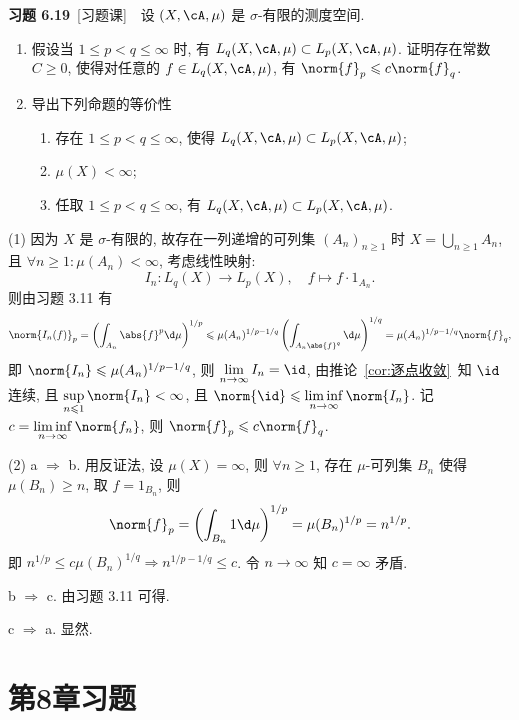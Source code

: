 	\textbf{习题 6.19}\ [习题课]\ \ 设 $ (X, \cA, \mu) $ 是 $ \sigma $-有限的测度空间.
	\begin{enumerate}
		\item 假设当 $ 1\leqslant p<q\leqslant\infty $ 时, 有 $ L_{q}(X, \cA, \mu)\subset L_{p}(X, \cA, \mu) $. 证明存在常数 $ C\geqslant0 $, 使得对任意的 $ f\in L_{q}(X, \cA, \mu) $, 有 $ \norm{f}_{p}\leqslant c\norm{f}_{q} $.
		\item 导出下列命题的等价性
		\begin{enumerate}
			\item 存在 $ 1\leqslant p<q\leqslant\infty $, 使得 $ L_{q}(X, \cA, \mu)\subset L_{p}(X, \cA, \mu) $;
			\item $ \mu(X)<\infty $;
			\item 任取 $ 1\leqslant p<q\leqslant\infty $, 有 $ L_{q}(X, \cA, \mu)\subset L_{p}(X, \cA, \mu) $.
		\end{enumerate}
	\end{enumerate}
	\begin{answer}
		(1) 因为 $ X $ 是 $ \sigma $-有限的, 故存在一列递增的可列集 $ (A_{n})_{n\geqslant1} $ 时 $ X=\bigcup_{n\geqslant1}A_{n} $, 且 $ \forall n\geqslant1:\mu(A_{n})<\infty $, 考虑线性映射:
		\[
			I_{n}: L_{q}(X)\to L_{p}(X), \quad f\mapsto f\cdot 1_{A_{n}}.
		\] 
		则由习题 3.11 有
		\[
			\norm{I_{n}(f)}_{p}=\left( \int_{A_{n}}\abs{f}^{p}\d \mu \right)^{1/p}\leqslant \mu(A_{n})^{1/p-1/q}\left( \int_{A_{n}\abs{f}^{q}}\d \mu \right)^{1/q}=\mu(A_{n})^{1/p-1/q}\norm{f}_{q},
		\]
		即 $ \norm{I_{n}}\leqslant\mu(A_{n})^{1/p-1/q} $, 则 $ \lim\limits_{n\to\infty}I_{n}=\id $, 由推论~\ref{cor:逐点收敛}~知 $ \id $ 连续, 且 $ \sup\limits_{n\leqslant1}\norm{I_{n}}<\infty $, 且 $ \norm{\id}\leqslant\liminf\limits_{n\to\infty}\norm{I_{n}} $. 记 $ c=\liminf\limits_{n\to\infty}\norm{f_{n}} $, 则 $ \norm{f}_{p}\leqslant c\norm{f}_{q} $.
		
		(2) a $ \Rightarrow $ b. 用反证法, 设 $ \mu(X)=\infty $, 则 $ \forall n\geqslant1 $, 存在 $ \mu $-可列集 $ B_{n} $ 使得 $ \mu(B_{n})\geqslant n $, 取 $ f = 1_{B_{n}} $, 则
		\[
			\norm{f}_{p}=\left( \int_{B_{n}}1\d \mu \right)^{1/p}=\mu(B_{n})^{1/p}=n^{1/p}.
		\]
		即 $ n^{1/p}\leqslant c\mu(B_{n})^{1/q}\Longrightarrow n^{1/p-1/q}\leqslant c $. 令 $ n\to \infty $ 知 $ c=\infty $ 矛盾.

		b $ \Rightarrow $ c. 由习题 3.11 可得.

		c $ \Rightarrow $ a. 显然.\qedhere
	\end{answer}

\section{第8章习题}

